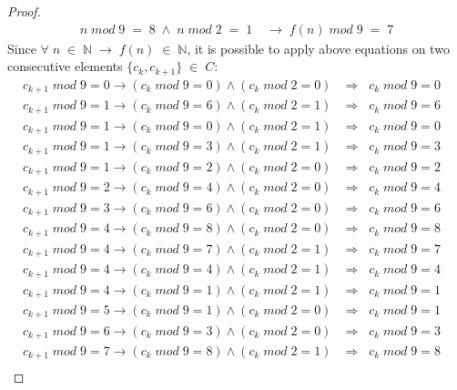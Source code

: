 \documentclass{jams-l}
\theoremstyle{definition}
\theoremstyle{remark}
\numberwithin{equation}{section}
\begin{document}
\begin{proof}
\begin{align}
    			n\;mod\;9\;=\;8\;\land\;n\;mod\;2\;=\;1\;&\longrightarrow\;f(n)\;mod\;9\;=\;7
    		\end{align}
    		Since $\forall\;n\;\in\;\mathbb{N}\;\rightarrow\;f(n)\;\in\;\mathbb{N}$, it is possible to apply above equations on two consecutive elements $\{c_{k},c_{k+1}\}\;\in\;C$:
    		\begin{align}
    			c_{k+1}\;mod\;9=0\rightarrow (c_{k}\;mod\;9=0)\land (c_{k}\;mod\;2=0) & \Longrightarrow \;\;c_{k}\;mod\;9 = 0&\\
    			c_{k+1}\;mod\;9=1\rightarrow (c_{k}\;mod\;9=6)\land (c_{k}\;mod\;2=1) & \Longrightarrow \;\;c_{k}\;mod\;9 = 6&\\
    			c_{k+1}\;mod\;9=1\rightarrow (c_{k}\;mod\;9=0)\land (c_{k}\;mod\;2=1) & \Longrightarrow \;\;c_{k}\;mod\;9 = 0&\\
    			c_{k+1}\;mod\;9=1\rightarrow (c_{k}\;mod\;9=3)\land (c_{k}\;mod\;2=1) & \Longrightarrow \;\;c_{k}\;mod\;9 = 3&\\
    			c_{k+1}\;mod\;9=1\rightarrow (c_{k}\;mod\;9=2)\land (c_{k}\;mod\;2=0) & \Longrightarrow \;\;c_{k}\;mod\;9 = 2&\\
    			c_{k+1}\;mod\;9=2\rightarrow (c_{k}\;mod\;9=4)\land (c_{k}\;mod\;2=0) & \Longrightarrow \;\;c_{k}\;mod\;9 = 4&\\
    			c_{k+1}\;mod\;9=3\rightarrow (c_{k}\;mod\;9=6)\land (c_{k}\;mod\;2=0) & \Longrightarrow \;\;c_{k}\;mod\;9 = 6&\\
    			c_{k+1}\;mod\;9=4\rightarrow (c_{k}\;mod\;9=8)\land (c_{k}\;mod\;2=0) & \Longrightarrow \;\;c_{k}\;mod\;9 = 8&\\
    			c_{k+1}\;mod\;9=4\rightarrow (c_{k}\;mod\;9=7)\land (c_{k}\;mod\;2=1) & \Longrightarrow \;\;c_{k}\;mod\;9 = 7&\\
    			c_{k+1}\;mod\;9=4\rightarrow (c_{k}\;mod\;9=4)\land (c_{k}\;mod\;2=1) & \Longrightarrow \;\;c_{k}\;mod\;9 = 4&\\
    			c_{k+1}\;mod\;9=4\rightarrow (c_{k}\;mod\;9=1)\land (c_{k}\;mod\;2=1) & \Longrightarrow \;\;c_{k}\;mod\;9 = 1&\\
    			c_{k+1}\;mod\;9=5\rightarrow (c_{k}\;mod\;9=1)\land (c_{k}\;mod\;2=0) & \Longrightarrow \;\;c_{k}\;mod\;9 = 1&\\
    			c_{k+1}\;mod\;9=6\rightarrow (c_{k}\;mod\;9=3)\land (c_{k}\;mod\;2=0) & \Longrightarrow \;\;c_{k}\;mod\;9 = 3&\\
    			c_{k+1}\;mod\;9=7\rightarrow (c_{k}\;mod\;9=8)\land (c_{k}\;mod\;2=1) & \Longrightarrow \;\;c_{k}\;mod\;9 = 8&\\

\end{align}
\end{proof}
\end{document}
